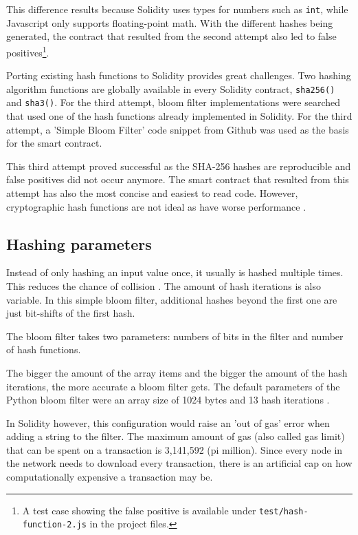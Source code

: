 This difference results because Solidity uses types for numbers such as \texttt{int}, while Javascript only supports floating-point math. With the different hashes being generated, the contract that resulted from the second attempt also led to false positives\footnote{A test case showing the false positive is available under \texttt{test/hash-function-2.js} in the project files.}.

Porting existing hash functions to Solidity provides great challenges. Two hashing algorithm functions are globally available in every Solidity contract, \texttt{sha256()} and \texttt{sha3()}. For the third attempt, bloom filter implementations were searched that used one of the hash functions already implemented in Solidity. For the third attempt, a 'Simple Bloom Filter' \cite{SimpleBloomFilter} code snippet from Github was used as the basis for the smart contract.

This third attempt proved successful as the SHA-256 hashes are reproducible and false positives did not occur anymore. The smart contract that resulted from this attempt has also the most concise and easiest to read code. However, cryptographic hash functions are not ideal as have worse performance \cite{BloomfilterHashingPerformance}. 

\subsection{Hashing parameters}

Instead of only hashing an input value once, it usually is hashed multiple times. This reduces the chance of collision \cite{MultipleHashes}. The amount of hash iterations is also variable. In this simple bloom filter, additional hashes beyond the first one are just bit-shifts of the first hash.

The bloom filter takes two parameters: numbers of bits in the filter and number of hash functions. 

The bigger the amount of the array items and the bigger the amount of the hash iterations, the more accurate a bloom filter gets. The default parameters of the Python bloom filter were an array size of 1024 bytes and 13 hash iterations \cite{SimpleBloomFilter}.

In Solidity however, this configuration would raise an 'out of gas' error when adding a string to the filter. 
The maximum amount of gas (also called gas limit) that can be spent on a transaction is 3,141,592 (pi million). Since every node in the network needs to download every transaction, there is an artificial cap on how computationally expensive a transaction may be.

